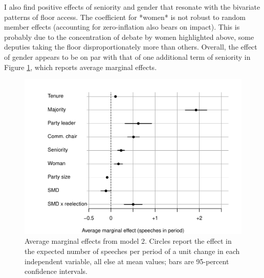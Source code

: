 \documentclass[letter,12pt]{article}
\begin{document}

I also find positive effects of seniority and gender that resonate with the bivariate patterns of floor access. The coefficient for *women* is not robust to random member effects (accounting for zero-inflation also bears on impact). This is probably due to the concentration of debate by women highlighted above, some deputies taking the floor disproportionately more than others. Overall, the effect of gender appears to be on par with that of one additional term of seniority in Figure \ref{F:avgmgeff}, which reports average marginal effects.

\begin{figure}
  \centering
    \includegraphics[width=.67\columnwidth]{../plots/avgMgEffects.pdf}
    \caption{Average marginal effects from model 2. Circles report the effect in the expected number of speeches per period of a unit change in each independent variable, all else at mean values; bars are 95-percent confidence intervals.}\label{F:avgmgeff}
\end{figure}
\end{document}
